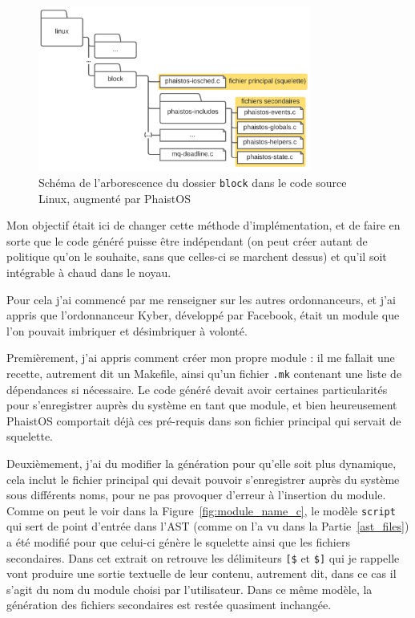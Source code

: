 \begin{figure}[h!t] \centering
    \includegraphics[width=0.8\textwidth]{images/linux_arch}
    \caption{Schéma de l'arborescence du dossier \texttt{block} dans le code 
    source Linux, augmenté par PhaistOS}
    \label{fig:modules_folder}
\end{figure}

Mon objectif était ici de changer cette méthode d'implémentation, et de faire 
en sorte que le code généré puisse être indépendant (on peut créer autant de 
politique qu'on le souhaite, sans que celles-ci se marchent dessus) et qu'il 
soit intégrable à chaud dans le noyau.

Pour cela j'ai commencé par me renseigner sur les autres ordonnanceurs, et j'ai 
appris que l'ordonnanceur Kyber, développé par Facebook, était un module que 
l'on pouvait imbriquer et désimbriquer à volonté. 

Premièrement, j'ai appris comment créer mon propre module : il me fallait 
une recette, autrement dit un Makefile, ainsi qu'un fichier \texttt{.mk} 
contenant une liste de dépendances si nécessaire. Le code généré devait avoir 
certaines particularités pour s'enregistrer auprès du système en tant que 
module, et bien heureusement PhaistOS comportait déjà ces pré-requis dans son 
fichier principal qui servait de squelette.

Deuxièmement, j'ai du modifier la génération pour qu'elle soit plus dynamique, 
cela inclut le fichier principal qui devait pouvoir s'enregistrer auprès du 
système sous différents noms, pour ne pas provoquer d'erreur à l'insertion du 
module. Comme on peut le voir dans la Figure~\ref{fig:module_name_c}, le modèle 
\texttt{script} qui sert de point d'entrée dans l'AST (comme on l'a vu dans la 
Partie~\ref{ast_files}) a été modifié pour que celui-ci génère le squelette 
ainsi que les fichiers secondaires. Dans cet extrait on retrouve les 
délimiteurs \texttt{[\$} et \texttt{\$]} qui je rappelle vont produire une 
sortie textuelle de leur contenu, autrement dit, dans ce cas il s'agit du nom 
du module choisi par l'utilisateur. Dans ce même modèle, la génération des 
fichiers secondaires est restée quasiment inchangée.

